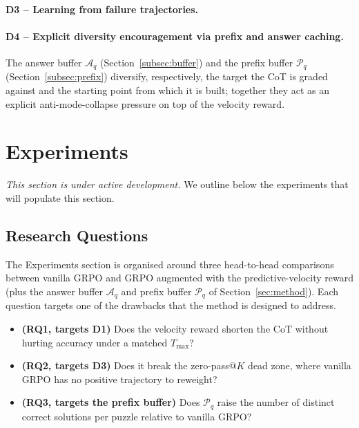 \documentclass{article}
\begin{document}
\paragraph{D3 -- Learning from failure trajectories.}

\paragraph{D4 -- Explicit diversity encouragement via prefix and answer
caching.} The answer buffer \(\mathcal{A}_q\)
(Section~\ref{subsec:buffer}) and the prefix buffer \(\mathcal{P}_q\)
(Section~\ref{subsec:prefix}) diversify, respectively, the target the
CoT is graded against and the starting point from which it is built;
together they act as an explicit anti-mode-collapse pressure on top of
the velocity reward.

\section{Experiments}
\label{sec:exp}

\textit{This section is under active development.} We outline below the
experiments that will populate this section.

\subsection{Research Questions}
\label{subsec:rq}

The Experiments section is organised around three head-to-head comparisons
between vanilla GRPO and GRPO augmented with the predictive-velocity reward
(plus the answer buffer \(\mathcal{A}_q\) and prefix buffer \(\mathcal{P}_q\)
of Section~\ref{sec:method}). Each question targets one of the drawbacks
that the method is designed to address.

\begin{itemize}
  \item \textbf{(RQ1, targets D1)} Does the velocity reward shorten the
        CoT without hurting accuracy under a matched \(T_{\max}\)?
  \item \textbf{(RQ2, targets D3)} Does it break the zero-pass@\(K\)
        dead zone, where vanilla GRPO has no positive trajectory to
        reweight?
  \item \textbf{(RQ3, targets the prefix buffer)} Does
        \(\mathcal{P}_q\) raise the number of distinct correct
        solutions per puzzle relative to vanilla GRPO?
\end{itemize}
\end{document}
